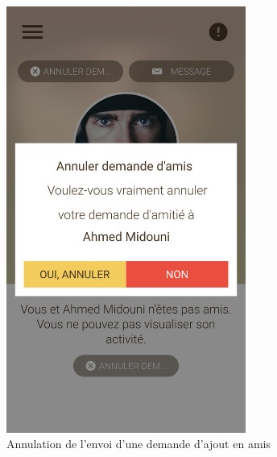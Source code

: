 \documentclass[11pt,a4paper,oneside]{book}
\begin{document}
					\begin{figure}[H]
						\centering
						\includegraphics[width=0.7\textwidth]{../Maquettes/Hanimo-maquettes/Output/05-View-User-Cancel-Friend-Request}
						\caption{Annulation de l’envoi d’une demande d’ajout en amis}
						\label{fig:05-view-user-cancel-friend-request}
					\end{figure}
				\vfill
				
\end{document}
